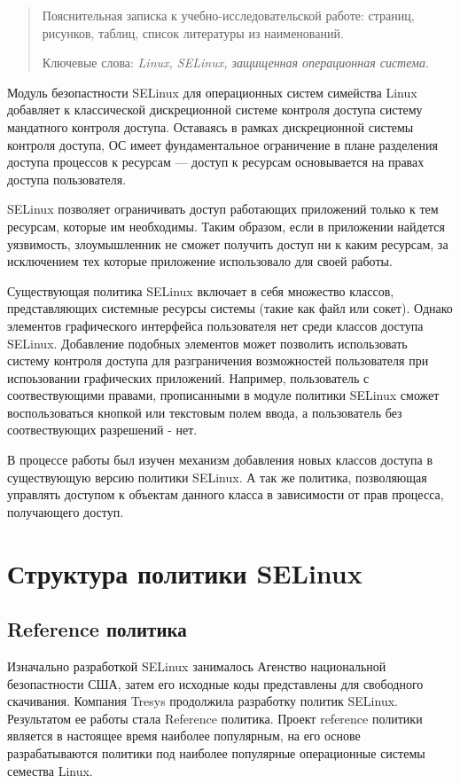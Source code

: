 \documentclass{./../class/UIR}
\begin{document}
\maketitle
\begin{abstract}
Пояснительная записка к учебно-исследовательской работе:  страниц,  рисунков,  таблиц, список литературы из  наименований.

Ключевые слова: \textit{Linux, SELinux, защищенная операционная система}.

\end{abstract}

\tableofcontents
{}
Модуль безопастности SELinux для операционных систем симейства Linux добавляет к
классической дискреционной системе контроля доступа систему мандатного
контроля доступа. Оставаясь в рамках дискреционной системы контроля доступа, ОС
имеет фундаментальное ограничение в плане разделения доступа процессов к ресурсам
 — доступ к ресурсам основывается на правах доступа пользователя.
 
SELinux позволяет ограничивать доступ работающих приложений только к
тем ресурсам, которые им необходимы. Таким образом, если в
приложении найдется уязвимость, злоумышленник не сможет получить
доступ ни к каким ресурсам, за исключением тех которые приложение
использовало для своей работы.

Существующая политика SELinux включает в себя
множество классов, представляющих системные ресурсы системы (такие как файл или
сокет). Однако элементов графического интерфейса пользователя нет среди классов
доступа SELinux. Добавление подобных элементов может позволить использовать
систему контроля доступа для разграничения возможностей пользователя при
испоьзовании графических приложений. Например, пользователь с соотвествующими
правами, прописанными в модуле политики SELinux сможет воспользоваться кнопкой
или текстовым полем ввода, а пользователь без соотвествующих разрешений - нет. 

В процессе работы был изучен механизм добавления новых классов доступа в
существующую версию политики SELinux. А так же политика, позволяющая управлять
доступом к объектам данного класса в зависимости от прав процесса, получающего
доступ.
 
 
\section{Структура политики SELinux}	
	\subsection{Reference политика}
	Изначально разработкой SELinux занималось Агенство национальной безопастности
	США, затем его исходные коды представлены для свободного скачивания. Компания
	Tresys продолжила разработку политик SELinux. Результатом ее работы стала
	Reference политика. Проект reference политики является в настоящее время
	наиболее популярным, на его основе разрабатываются политики под наиболее
	популярные операционные системы семества Linux.
	 
\end{document}
